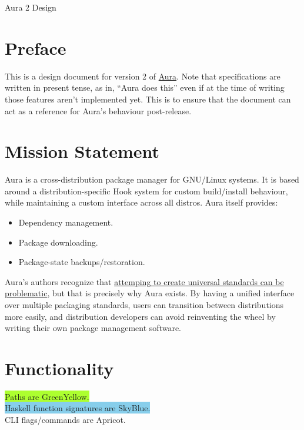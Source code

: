 \documentclass{article}
\begin{document}

\tableofcontents
\clearpage

Aura 2 Design

\section{Preface}\label{preface}

This is a design document for version 2 of
\href{https://github.com/fosskers/aura}{Aura}. Note that specifications
are written in present tense, as in, ``Aura does this'' even if at the
time of writing those features aren't implemented yet. This is to ensure
that the document can act as a reference for Aura's behaviour
post-release.

\section{Mission Statement}\label{mission-statement}

Aura is a cross-distribution package manager for GNU/Linux systems. It
is based around a distribution-specific Hook system for custom
build/install behaviour, while maintaining a custom interface across all
distros. Aura itself provides:

\begin{itemize}
\itemsep1pt\parskip0pt
\item
  Dependency management.
\item
  Package downloading.
\item
  Package-state backups/restoration.
\end{itemize}

Aura's authors recognize that \href{http://www.xkcd.com/927/}{attemping
to create universal standards can be problematic}, but that is precisely
why Aura exists. By having a unified interface over multiple packaging
standards, users can transition between distributions more easily, and
distribution developers can avoid reinventing the wheel by writing their
own package management software.

\section{Functionality}
\colorbox{GreenYellow}{Paths are GreenYellow.}\\
\colorbox{SkyBlue}{Haskell function signatures are SkyBlue.}\\
\colorbox{Apricot}{CLI flags/commands are Apricot.}
\end{document}
